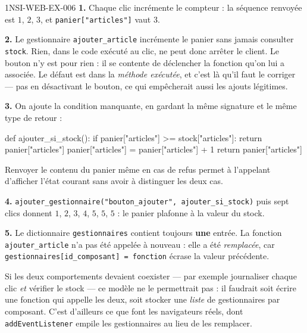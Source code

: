 \begin{corrige}{1NSI-WEB-EX-006}
\textbf{1.} Chaque clic incrémente le compteur : la séquence renvoyée est
$1$, $2$, $3$, et \lstinline{panier["articles"]} vaut $3$.

\textbf{2.} Le gestionnaire \lstinline{ajouter_article} incrémente le panier
sans jamais consulter \lstinline{stock}. Rien, dans le code exécuté au clic, ne
peut donc arrêter le client. Le bouton n'y est pour rien : il se contente de
déclencher la fonction qu'on lui a associée. Le défaut est dans la
\emph{méthode exécutée}, et c'est là qu'il faut le corriger — pas en désactivant
le bouton, ce qui empêcherait aussi les ajouts légitimes.

\textbf{3.} On ajoute la condition manquante, en gardant la même signature et
le même type de retour :
\begin{python}
def ajouter_si_stock():
    if panier["articles"] >= stock["articles"]:
        return panier["articles"]
    panier["articles"] = panier["articles"] + 1
    return panier["articles"]
\end{python}
Renvoyer le contenu du panier même en cas de refus permet à l'appelant
d'afficher l'état courant sans avoir à distinguer les deux cas.

\textbf{4.} \lstinline{ajouter_gestionnaire("bouton_ajouter", ajouter_si_stock)}
puis sept clics donnent $1$, $2$, $3$, $4$, $5$, $5$, $5$ : le panier plafonne à
la valeur du stock.

\textbf{5.} Le dictionnaire \lstinline{gestionnaires} contient toujours
\textbf{une} entrée. La fonction \lstinline{ajouter_article} n'a pas été
appelée à nouveau : elle a été \emph{remplacée}, car
\lstinline{gestionnaires[id_composant] = fonction} écrase la valeur précédente.

Si les deux comportements devaient coexister — par exemple journaliser chaque
clic \emph{et} vérifier le stock — ce modèle ne le permettrait pas : il faudrait
soit écrire une fonction qui appelle les deux, soit stocker une \emph{liste} de
gestionnaires par composant. C'est d'ailleurs ce que font les navigateurs réels,
dont \lstinline{addEventListener} empile les gestionnaires au lieu de les
remplacer.
\end{corrige}
